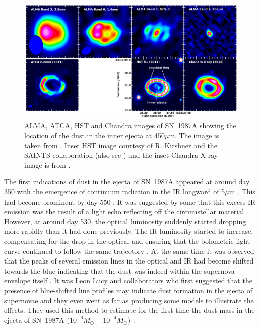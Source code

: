 \begin{figure}
\centering
\includegraphics[clip=true,scale=0.31,trim= 0 0 0 0]{chapters/chapter5/images/ALMA_imgs.png}
\caption{ALMA, ATCA, HST and Chandra images of SN~1987A showing the location of the dust in the inner ejecta at 450$\mu$m.  The image is taken from \citep{Indebetouw2014}.  Inset HST image courtesy of R. Kirshner and the SAINTS collaboration (also see \citet{Larsson2013}) and the inset Chandra X-ray image is from \citet{Helder2013}.}
\label{ALMA}
\end{figure}

The first indications of dust in the ejecta of SN~1987A appeared at around day 350 with the emergence of continuum radiation in the IR longward of 5$\mu$m \citep{Meikle1993}.  This had become prominent by day 550 \citep{Roche1993,Wooden1993}.  It was suggested by some that this excess IR emission was the result of  a light echo reflecting off the circumstellar material \citep{Roche1989}.  However, at around day 530, the optical luminosity suddenly started dropping more rapidly than it had done previously.  The IR luminosity started to increase,  compensating for the drop in the optical and ensuring that the bolometric light curve continued to follow the same trajectory \citep{Suntzeff1991,Whitelock1991}.  At the same time it was observed that the peaks of several emission lines in the optical and IR had become shifted towards the blue indicating that the dust was indeed within the supernova envelope itself \citep{Lucy1989,Danziger1991a,Danziger1991,Meikle1991,Meikle1993,Suntzeff1991,Hanuschik1993}.  It was Leon Lucy and collaborators who first suggested that the presence of blue-shifted line profiles may indicate dust formation in the ejecta of supernovae and they even went as far as producing some models to illustrate the effects.  They used this method  to estimate for the first time the dust mass in the ejecta of SN~1987A ($10^{-6}M_{\odot} - 10^{-4}M_{\odot}$)  \citep{Lucy1989,Lucy1991}.  

